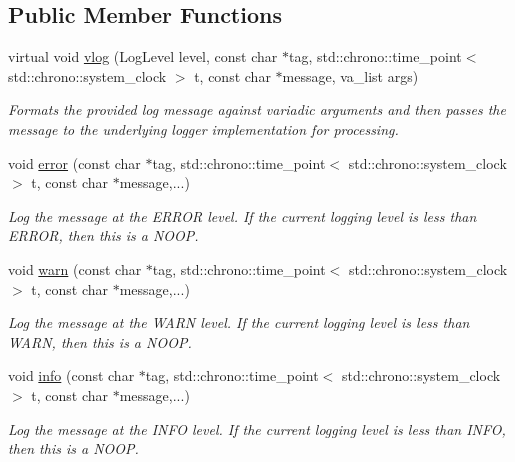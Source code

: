 \subsection*{Public Member Functions}
\begin{DoxyCompactItemize}
\item 
virtual void \hyperlink{class_aws_1_1_iot_1_1_device_client_1_1_logging_1_1_logger_aee99f5d53316cb0dba7f517475f01443}{vlog} (Log\+Level level, const char $\ast$tag, std\+::chrono\+::time\+\_\+point$<$ std\+::chrono\+::system\+\_\+clock $>$ t, const char $\ast$message, va\+\_\+list args)
\begin{DoxyCompactList}\small\item\em Formats the provided log message against variadic arguments and then passes the message to the underlying logger implementation for processing. \end{DoxyCompactList}\item 
void \hyperlink{class_aws_1_1_iot_1_1_device_client_1_1_logging_1_1_logger_a2100929095644e9f5de260aca46f6142}{error} (const char $\ast$tag, std\+::chrono\+::time\+\_\+point$<$ std\+::chrono\+::system\+\_\+clock $>$ t, const char $\ast$message,...)
\begin{DoxyCompactList}\small\item\em Log the message at the E\+R\+R\+OR level. If the current logging level is less than E\+R\+R\+OR, then this is a N\+O\+OP. \end{DoxyCompactList}\item 
void \hyperlink{class_aws_1_1_iot_1_1_device_client_1_1_logging_1_1_logger_af7bb64146051fcd5b801ee2ed4e619d8}{warn} (const char $\ast$tag, std\+::chrono\+::time\+\_\+point$<$ std\+::chrono\+::system\+\_\+clock $>$ t, const char $\ast$message,...)
\begin{DoxyCompactList}\small\item\em Log the message at the W\+A\+RN level. If the current logging level is less than W\+A\+RN, then this is a N\+O\+OP. \end{DoxyCompactList}\item 
void \hyperlink{class_aws_1_1_iot_1_1_device_client_1_1_logging_1_1_logger_a9ac04311763fcffa096eb062ba479897}{info} (const char $\ast$tag, std\+::chrono\+::time\+\_\+point$<$ std\+::chrono\+::system\+\_\+clock $>$ t, const char $\ast$message,...)
\begin{DoxyCompactList}\small\item\em Log the message at the I\+N\+FO level. If the current logging level is less than I\+N\+FO, then this is a N\+O\+OP. \end{DoxyCompactList}\item 

\end{DoxyCompactItemize}

